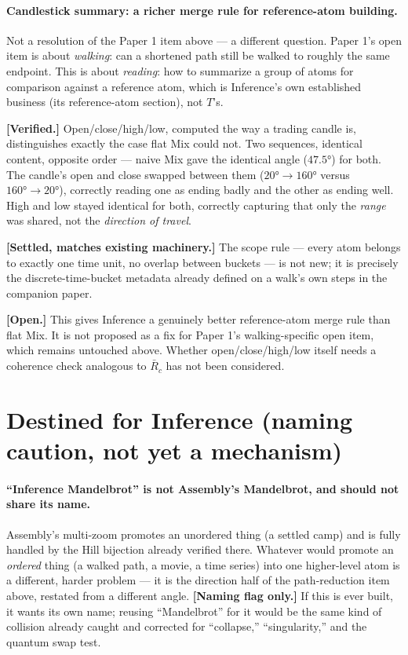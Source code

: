 \documentclass[11pt]{article}
\begin{document}
\paragraph{Candlestick summary: a richer merge rule for reference-atom
building.} Not a resolution of the Paper 1 item above --- a different
question. Paper 1's open item is about \emph{walking}: can a shortened
path still be walked to roughly the same endpoint. This is about
\emph{reading}: how to summarize a group of atoms for comparison
against a reference atom, which is Inference's own established
business (its reference-atom section), not $T$'s.

\textbf{[Verified.]} Open/close/high/low, computed the way a trading
candle is, distinguishes exactly the case flat Mix could not. Two
sequences, identical content, opposite order --- naive Mix gave the
identical angle ($47.5°$) for both. The candle's open and close swapped
between them ($20°\!\to\!160°$ versus $160°\!\to\!20°$), correctly
reading one as ending badly and the other as ending well. High and low
stayed identical for both, correctly capturing that only the
\emph{range} was shared, not the \emph{direction of travel}.

\textbf{[Settled, matches existing machinery.]} The scope rule ---
every atom belongs to exactly one time unit, no overlap between
buckets --- is not new; it is precisely the discrete-time-bucket
metadata already defined on a walk's own steps in the companion paper.

\textbf{[Open.]} This gives Inference a genuinely better reference-atom
merge rule than flat Mix. It is not proposed as a fix for Paper 1's
walking-specific open item, which remains untouched above. Whether
open/close/high/low itself needs a coherence check analogous to
$\bar R_c$ has not been considered.

\section{Destined for Inference (naming caution, not yet a mechanism)}

\paragraph{``Inference Mandelbrot'' is not Assembly's Mandelbrot, and
should not share its name.} Assembly's multi-zoom promotes an
unordered thing (a settled camp) and is fully handled by the Hill
bijection already verified there. Whatever would promote an
\emph{ordered} thing (a walked path, a movie, a time series) into one
higher-level atom is a different, harder problem --- it is the
direction half of the path-reduction item above, restated from a
different angle. \textbf{[Naming flag only.]} If this is ever built,
it wants its own name; reusing ``Mandelbrot'' for it would be the same
kind of collision already caught and corrected for ``collapse,''
``singularity,'' and the quantum swap test.
\end{document}
